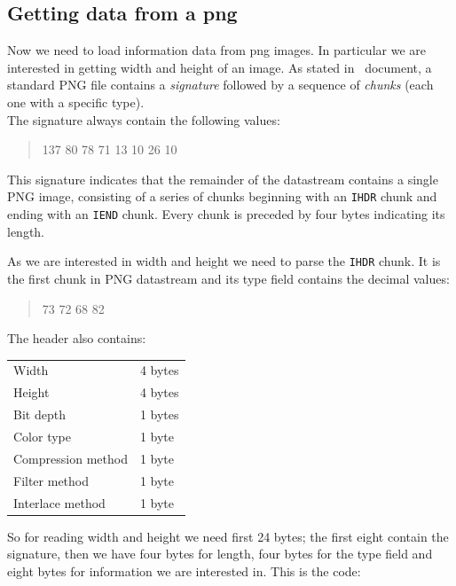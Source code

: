 \documentclass[11pt,oneside]{article}	%
\begin{document}
\subsection{Getting data from a png}\label{sec:getData}

Now we need to load information data from png images. In particular we are interested in getting width and height of an image. As stated in~\cite{W3CPNG} document, a standard PNG file contains a \textit{signature} followed by a sequence of \textit{chunks} (each one with a specific type).\\

The signature always contain the following values:

\begin{quote}
 137 80 78 71 13 10 26 10
\end{quote}
   
This signature indicates that the remainder of the datastream contains a single PNG image, consisting of a series of chunks beginning with an \texttt{IHDR} chunk and ending with an \texttt{IEND} chunk. Every chunk is preceded by four bytes indicating its length.

As we are interested in width and height we need to parse the \texttt{IHDR} chunk. It is the first chunk in PNG datastream and its type field contains the decimal values:

\begin{quote}
 73 72 68 82
\end{quote}

The header also contains:\\

\begin{tabular}{l l}
  Width & 4 bytes\\
  Height & 4 bytes\\
  Bit depth & 1 bytes\\
  Color type & 1 byte\\
  Compression method & 1 byte\\
  Filter method & 1 byte\\
  Interlace method & 1 byte\\
\end{tabular}
\newline

So for reading width and height we need first 24 bytes; the first eight contain the signature, then we have four bytes for length, four bytes for the type field and eight bytes for information we are interested in. This is the code:
\end{document}
